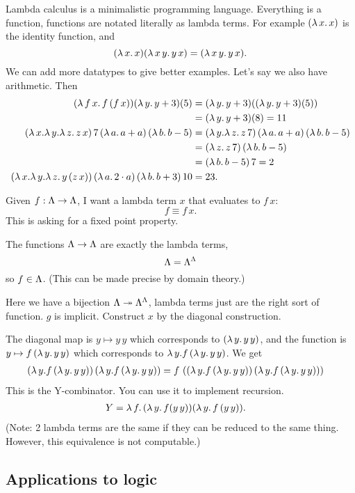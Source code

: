 \documentclass[11pt]{article}
\begin{document}
Lambda calculus is a minimalistic programming language. %
Everything is a function, functions are notated literally as lambda terms. For example $(\lambda \,x.\,x)$ is the identity function, and
$$
(\lambda \,x.\,x)(\lambda \,x\,y.\,y\,x) = (\lambda \,x\,y.\,y\,x).
$$
We can add more datatypes to give better examples. Let's say we also have arithmetic.
Then
\begin{align}
(\lambda \,f\,x.\,f\,(f\,x))(\lambda\,y.\,y+3)(5) 
&= (\lambda\,y.\,y+3)((\lambda\,y.\,y+3)(5))\\
& =(\lambda\,y.\,y+3)(8)=11\\
(\lambda\,x.\lambda\,y.\lambda\,z.\,z\,x) \,7\, (\lambda \,a. \,a+a) \,(\lambda\,b.\, b- 5) &=
(\lambda\,y.\lambda\,z.\,z\,7) \, (\lambda \,a. \,a+a) \,(\lambda\,b.\, b- 5) \\
&=
(\lambda\,z.\,z\,7)  \,(\lambda\,b.\, b- 5)\\
&=(\lambda\,b.\, b- 5)\, 7=2\\
(\lambda\,x.\lambda\,y.\lambda\,z.\,y\,(z\,x)) \,(\lambda\,a.\,2\cdot a)\,(\lambda\,b.\,b+3)\,10 &=23. 
\end{align}

Given $f:\Lambda \to \Lambda$, I want a lambda term $x$ that evaluates to $f\,x$:
$$f\equiv f \,x .$$
This is asking for a fixed point property.

The functions $\Lambda\to \Lambda$ are exactly the lambda terms, 
$$\Lambda = \Lambda^\Lambda$$
so $f\in \Lambda$. (This can be made precise by domain theory.)

Here we have a bijection $\Lambda \twoheadrightarrow \Lambda^\Lambda$, lambda terms just are the right sort of function. $g$ is implicit.
Construct $x$ by the diagonal construction. 

The diagonal map is $y\mapsto y\,y$ which corresponds to $(\lambda \,y.\,y\,y)$, and the function is $y\mapsto f \, (\lambda \,y.\,y\,y)$ which corresponds to $\lambda \,y. f \, (\lambda \,y.\,y\,y)$. We get
\begin{align}
(\lambda \,y. f \, (\lambda \,y.\,y\,y))\,(\lambda \,y. f \, (\lambda \,y.\,y\,y))
&= f\, \left( {
(\lambda \,y. f \, (\lambda \,y.\,y\,y))\,(\lambda \,y. f \, (\lambda \,y.\,y\,y))
} \right)
\end{align}
This is the Y-combinator. You can use it to implement recursion.
\begin{align}
Y&=\lambda \,f .\,(\lambda \,y.\,f(y\,y))(\lambda \, y.\, f\, (y\, y)).
\end{align}
(Note: 2 lambda terms are the same if they can be reduced to the same thing. However, this equivalence is not computable.)

\subsection{Applications to logic}
\end{document}

